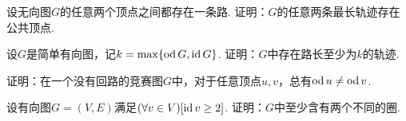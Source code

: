 \begin{example}
设无向图\(G\)的任意两个顶点之间都存在一条路.
证明：\(G\)的任意两条最长轨迹存在公共顶点.
\end{example}

\begin{example}
设\(G\)是简单有向图，记\(k = \max\{\operatorname{od} G,\operatorname{id} G\}\).
证明：\(G\)中存在路长至少为\(k\)的轨迹.
\end{example}

\begin{example}
证明：在一个没有回路的竞赛图\(G\)中，对于任意顶点\(u,v\)，总有\(\operatorname{od} u \neq \operatorname{od} v\).
\end{example}

\begin{example}
设有向图\(G = (V,E)\)满足\((\forall v \in V)[\operatorname{id} v \geq 2]\).
证明：\(G\)中至少含有两个不同的圈.
\end{example}
